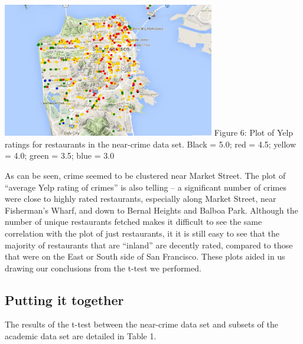 \documentclass{article}
\begin{document}
\begin{center}
  \includegraphics[keepaspectratio=true, width=350px]{unique_yelp_rating_plot.jpg}
  Figure 6: Plot of Yelp ratings for restaurants in the near-crime data
  set. Black = 5.0; red = 4.5; yellow = 4.0; green = 3.5; blue = 3.0 \\[20pt]
\end{center}

As can be seen, crime seemed to be clustered near Market Street. The plot
of ``average Yelp rating of crimes'' is also telling -- a significant
number of crimes were close to highly rated restaurants, especially along
Market Street, near Fisherman's Wharf, and down to Bernal Heights and
Balboa Park. Although the number of unique restaurants fetched makes it
difficult to see the same correlation with the plot of just restaurants, it
it is still easy to see that the majority of restaurants that are
``inland'' are decently rated, compared to those that were on the East or
South side of San Francisco. These plots aided in us drawing our
conclusions from the t-test we performed.

\subsection{Putting it together}

The results of the t-test between the near-crime data set and subsets of
the academic data set are detailed in Table 1.
\end{document}

